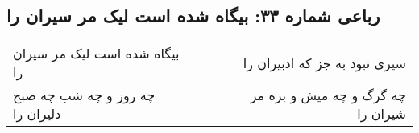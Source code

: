 \begin{center}
\section*{رباعی شماره ۳۳: بیگاه شده است لیک مر سیران را}
\label{sec:0033}
\begin{longtable}{l p{0.5cm} r}
بیگاه شده است لیک مر سیران را
&&
سیری نبود به جز که ادبیران را
\\
چه روز و چه شب چه صبح دلیران را
&&
چه گرگ و چه میش و بره مر شیران را
\\
\end{longtable}
\end{center}
